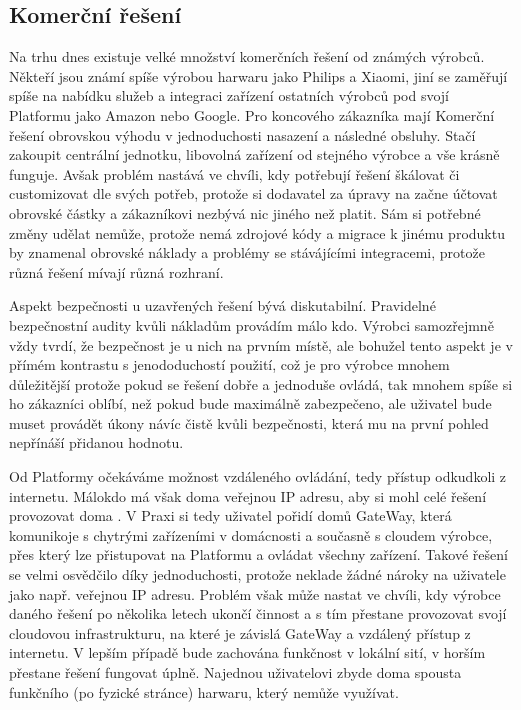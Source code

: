 \documentclass[thesis=B,czech]{FITthesis}[2019/12/23]
\begin{document}
\subsection{Komerční řešení} %
Na trhu dnes existuje velké množství komerčních řešení od známých výrobců. Někteří jsou známí spíše výrobou harwaru jako Philips a Xiaomi, jiní se zaměřují spíše na nabídku služeb a integraci zařízení ostatních výrobců pod svojí Platformu jako Amazon nebo Google. Pro koncového zákazníka mají Komerční řešení obrovskou výhodu v jednoduchosti nasazení a následné obsluhy. Stačí zakoupit centrální jednotku, libovolná zařízení od stejného výrobce a vše krásně funguje. Avšak problém nastává ve chvíli, kdy potřebují řešení škálovat či customizovat dle svých potřeb, protože si dodavatel za úpravy na  začne účtovat obrovské částky a zákazníkovi nezbývá nic jiného než platit. Sám si potřebné změny udělat nemůže, protože nemá zdrojové kódy a migrace k jinému produktu by znamenal obrovské náklady a problémy se stávájícími integracemi, protože různá řešení mívají různá rozhraní.

Aspekt bezpečnosti u uzavřených řešení bývá diskutabilní. Pravidelné bezpečnostní audity kvůli nákladům provádím málo kdo. Výrobci samozřejmně vždy tvrdí, že bezpečnost je u nich na prvním místě, ale bohužel tento aspekt je v přímém kontrastu s jenododuchostí použití, což je pro výrobce mnohem důležitější protože pokud se řešení dobře a jednoduše ovládá, tak mnohem spíše si ho zákazníci oblíbí, než pokud bude maximálně zabezpečeno, ale uživatel bude muset provádět úkony návíc čistě kvůli bezpečnosti, která mu na první pohled nepřínáší přidanou hodnotu.

Od Platformy očekáváme možnost vzdáleného ovládání, tedy přístup odkudkoli z internetu. Málokdo má však doma veřejnou IP adresu, aby si mohl celé řešení provozovat doma . V Praxi si tedy uživatel pořidí domů GateWay, která komunikoje s chytrými zařízeními v domácnosti a současně s cloudem výrobce, přes který lze přistupovat na Platformu a ovládat všechny zařízení. Takové řešení se velmi osvědčilo díky jednoduchosti, protože neklade žádné nároky na uživatele jako např. veřejnou IP adresu. Problém však může nastat ve chvíli, kdy výrobce daného řešení po několika letech ukončí činnost a s tím přestane provozovat svojí cloudovou infrastrukturu, na které je závislá GateWay a vzdálený přístup z internetu. V lepším případě bude zachována funkčnost v lokální sití, v horším přestane řešení fungovat úplně. Najednou uživatelovi zbyde doma spousta funkčního (po fyzické stránce) harwaru, který nemůže využívat.
\end{document}
